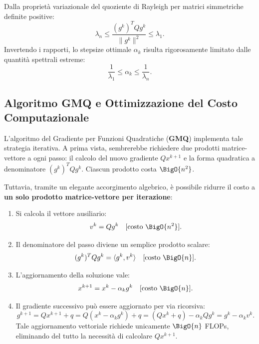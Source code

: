\begin{property}
Dalla propriet\`a variazionale del quoziente di Rayleigh per matrici simmetriche definite positive:
\begin{equation}
    \lambda_n \le \frac{(g^k)^T Q g^k}{\|g^k\|^2} \le \lambda_1.
\end{equation}
Invertendo i rapporti, lo stepsize ottimale $\alpha_k$ risulta rigorosamente limitato dalle quantit\`a spettrali estreme:
\begin{equation}
    \frac{1}{\lambda_1} \le \alpha_k \le \frac{1}{\lambda_n}.
\end{equation}
\end{property}

\subsection{Algoritmo GMQ e Ottimizzazione del Costo Computazionale}
L'algoritmo del Gradiente per Funzioni Quadratiche (\textbf{GMQ}) implementa tale strategia iterativa. A prima vista, sembrerebbe richiedere due prodotti matrice-vettore a ogni passo: il calcolo del nuovo gradiente $Q x^{k+1}$ e la forma quadratica a denominatore $(g^k)^T Q g^k$. Ciascun prodotto costa $\BigO{n^2}$.

Tuttavia, tramite un elegante accorgimento algebrico, \`e possibile ridurre il costo a \textbf{un solo prodotto matrice-vettore per iterazione}:
\begin{enumerate}
    \item Si calcola il vettore ausiliario:
    \begin{equation}
        v^k = Q g^k \quad [\text{costo } \BigO{n^2}].
    \end{equation}
    \item Il denominatore del passo diviene un semplice prodotto scalare:
    \begin{equation}
        (g^k)^T Q g^k = \langle g^k, v^k \rangle \quad [\text{costo } \BigO{n}].
    \end{equation}
    \item L'aggiornamento della soluzione vale:
    \begin{equation}
        x^{k+1} = x^k - \alpha_k g^k \quad [\text{costo } \BigO{n}].
    \end{equation}
    \item Il gradiente successivo pu\`o essere aggiornato per via ricorsiva:
    \begin{equation}
        g^{k+1} = Q x^{k+1} + q = Q(x^k - \alpha_k g^k) + q = (Q x^k + q) - \alpha_k Q g^k = g^k - \alpha_k v^k.
    \end{equation}
    Tale aggiornamento vettoriale richiede unicamente $\BigO{n}$ FLOPs, eliminando del tutto la necessit\`a di calcolare $Q x^{k+1}$.
\end{enumerate}

